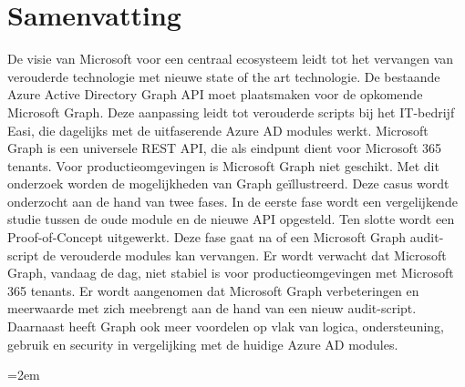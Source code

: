 \documentclass[dutch,dit,thesis]{hogentreport}
\begin{document}
\section*{Samenvatting}

De visie van Microsoft voor een centraal ecosysteem leidt tot het vervangen van verouderde technologie met nieuwe state of the art technologie. De bestaande Azure Active Directory Graph API moet plaatsmaken voor de opkomende Microsoft Graph. Deze aanpassing leidt tot verouderde scripts bij het IT-bedrijf Easi, die dagelijks met de uitfaserende Azure AD modules werkt. Microsoft Graph is een universele REST API, die als eindpunt dient voor Microsoft 365 tenants. Voor productieomgevingen is Microsoft Graph niet geschikt. Met dit onderzoek worden de mogelijkheden van Graph geïllustreerd. Deze casus wordt onderzocht aan de hand van twee fases. In de eerste fase wordt een vergelijkende studie tussen de oude module en de nieuwe API opgesteld. Ten slotte wordt een Proof-of-Concept uitgewerkt. Deze fase gaat na of een Microsoft Graph audit-script de verouderde modules kan vervangen. Er wordt verwacht dat Microsoft Graph, vandaag de dag, niet stabiel is voor productieomgevingen met Microsoft 365 tenants. Er wordt aangenomen dat Microsoft Graph verbeteringen en meerwaarde met zich meebrengt aan de hand van een nieuw audit-script. Daarnaast heeft Graph ook meer voordelen op vlak van logica, ondersteuning, gebruik en security in vergelijking met de huidige Azure AD modules.



%


\backmatter{}

\emergencystretch=2em
\setlength\bibitemsep{2pt} %
\printbibliography[heading=bibintoc]
\end{document}
